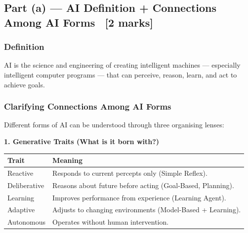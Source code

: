 \documentclass[12pt, a4paper]{article}
\begin{document}
\subsection{Part (a) — AI Definition + Connections Among AI Forms \ [2 marks]}

\subsubsection*{Definition}

\noindent AI is the science and engineering of creating intelligent machines — especially intelligent computer programs — that can perceive, reason, learn, and act to achieve goals.

\subsubsection*{Clarifying Connections Among AI Forms}

\noindent Different forms of AI can be understood through three organising lenses:

\vspace{0.3em}
\noindent\textbf{1. Generative Traits (What is it born with?)}

\begin{center}
\renewcommand{\arraystretch}{1.2}
\begin{tabular}{l|p{12cm}}
\toprule
\textbf{Trait} & \textbf{Meaning} \\
\midrule
Reactive & Responds to current percepts only (Simple Reflex). \\
Deliberative & Reasons about future before acting (Goal-Based, Planning). \\
Learning & Improves performance from experience (Learning Agent). \\
Adaptive & Adjusts to changing environments (Model-Based + Learning). \\
Autonomous & Operates without human intervention. \\
\bottomrule
\end{tabular}
\end{center}
\end{document}

